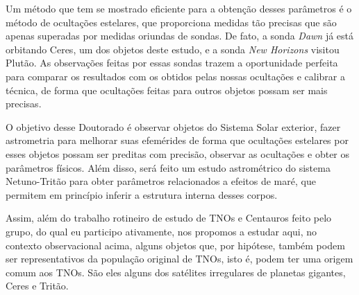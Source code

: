 \documentclass[12pt,a4paper]{report}
\begin{document}
Um método que tem se mostrado eficiente para a obtenção desses parâmetros é o método de ocultações estelares, que proporciona medidas tão precisas que são apenas superadas por medidas oriundas de sondas. De fato, a sonda \textit{Dawn} já está orbitando Ceres, um dos objetos deste estudo, e a sonda \textit{New Horizons} visitou Plutão. As observações feitas por essas sondas trazem a oportunidade perfeita para comparar os resultados com os obtidos pelas nossas ocultações e calibrar a técnica, de forma que ocultações feitas para outros objetos possam ser mais precisas.

O objetivo desse Doutorado é observar objetos do Sistema Solar exterior, fazer astrometria para melhorar suas efemérides de forma que ocultações estelares por esses objetos possam ser preditas com precisão, observar as ocultações e obter os parâmetros físicos. Além disso, será feito um estudo astrométrico do sistema Netuno-Tritão para obter parâmetros relacionados a efeitos de maré, que permitem em princípio inferir a estrutura interna desses corpos.

Assim, além do trabalho rotineiro de estudo de TNOs e Centauros feito pelo grupo, do qual eu participo ativamente, nos propomos a estudar aqui, no contexto observacional acima, alguns objetos que, por hipótese, também podem ser representativos da população original de TNOs, isto é, podem ter uma origem comum aos TNOs. São eles alguns dos satélites irregulares de planetas gigantes, Ceres e Tritão.

\end{document}
